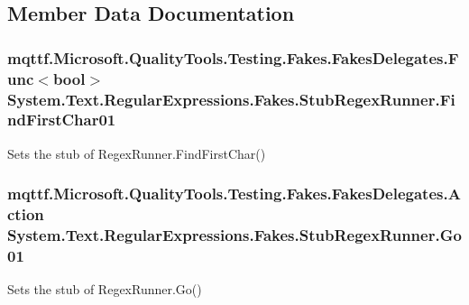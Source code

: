 \subsection{Member Data Documentation}
\hypertarget{class_system_1_1_text_1_1_regular_expressions_1_1_fakes_1_1_stub_regex_runner_a30663cde01086cf903ddcc500ed24b9d}{
\subsubsection[{Find\-First\-Char01}]{\setlength{\rightskip}{0pt plus 5cm}mqttf.\-Microsoft.\-Quality\-Tools.\-Testing.\-Fakes.\-Fakes\-Delegates.\-Func$<$bool$>$ System.\-Text.\-Regular\-Expressions.\-Fakes.\-Stub\-Regex\-Runner.\-Find\-First\-Char01}}\label{class_system_1_1_text_1_1_regular_expressions_1_1_fakes_1_1_stub_regex_runner_a30663cde01086cf903ddcc500ed24b9d}


Sets the stub of Regex\-Runner.\-Find\-First\-Char()

\hypertarget{class_system_1_1_text_1_1_regular_expressions_1_1_fakes_1_1_stub_regex_runner_aa82a7ae27ae72a950d91e1bcfb4cadc9}{
\subsubsection[{Go01}]{\setlength{\rightskip}{0pt plus 5cm}mqttf.\-Microsoft.\-Quality\-Tools.\-Testing.\-Fakes.\-Fakes\-Delegates.\-Action System.\-Text.\-Regular\-Expressions.\-Fakes.\-Stub\-Regex\-Runner.\-Go01}}\label{class_system_1_1_text_1_1_regular_expressions_1_1_fakes_1_1_stub_regex_runner_aa82a7ae27ae72a950d91e1bcfb4cadc9}


Sets the stub of Regex\-Runner.\-Go()

